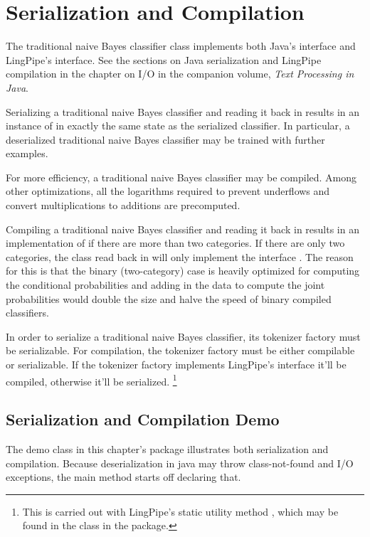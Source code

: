 \section{Serialization and Compilation}

The traditional naive Bayes classifier class implements both Java's
 interface and LingPipe's 
interface.  See the sections on Java serialization and LingPipe
compilation in the chapter on I/O in the companion volume, {\it Text
Processing in Java}.

Serializing a traditional naive Bayes classifier and reading it
back in results in an instance of  in
exactly the same state as the serialized classifier.  In particular,
a deserialized traditional naive Bayes classifier may be trained
with further examples.  

For more efficiency, a traditional naive Bayes classifier may be
compiled.  Among other optimizations, all the logarithms required
to prevent underflows and convert multiplications to additions
are precomputed.  

Compiling a traditional naive Bayes classifier and reading it back in
results in an implementation of 
if there are more than two categories.  If there are only two
categories, the class read back in will only implement the interface
.  The reason for this is
that the binary (two-category) case is heavily optimized for computing
the conditional probabilities and adding in the data to compute the
joint probabilities would double the size and halve the speed of
binary compiled classifiers.

In order to serialize a traditional naive Bayes classifier, its
tokenizer factory must be serializable.  For compilation, the
tokenizer factory must be either compilable or serializable.  If
the tokenizer factory implements LingPipe's  interface
it'll be compiled, otherwise it'll be serialized.%
%
\footnote{This is carried out with LingPipe's static utility method
  , which may be found in the
   class in the 
  package.}

\subsection{Serialization and Compilation Demo}

The demo class  in this chapter's package
illustrates both serialization and compilation.  Because
deserialization in java may throw class-not-found and I/O exceptions,
the main method starts off declaring that.
%

